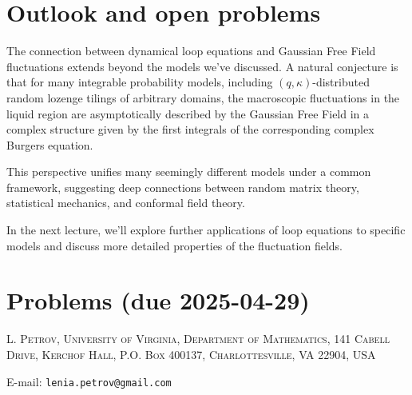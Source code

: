 \documentclass[letterpaper,11pt,oneside,reqno]{article}
\numberwithin{equation}{section}
\theoremstyle{definition}
\begin{document}
\section{Outlook and open problems}

The connection between dynamical loop equations and Gaussian Free Field fluctuations extends beyond the models we've discussed. A natural conjecture is that for many integrable probability models, including $(q,\kappa)$-distributed random lozenge tilings of arbitrary domains, the macroscopic fluctuations in the liquid region are asymptotically described by the Gaussian Free Field in a complex structure given by the first integrals of the corresponding complex Burgers equation.

This perspective unifies many seemingly different models under a common framework, suggesting deep connections between random matrix theory, statistical mechanics, and conformal field theory.

In the next lecture, we'll explore further applications of loop equations to specific models and discuss more detailed properties of the fluctuation fields.



\appendix
\setcounter{section}{8}

\section{Problems (due 2025-04-29)}









\medskip

\textsc{L. Petrov, University of Virginia, Department of Mathematics, 141 Cabell Drive, Kerchof Hall, P.O. Box 400137, Charlottesville, VA 22904, USA}

E-mail: \texttt{lenia.petrov@gmail.com}
\end{document}
